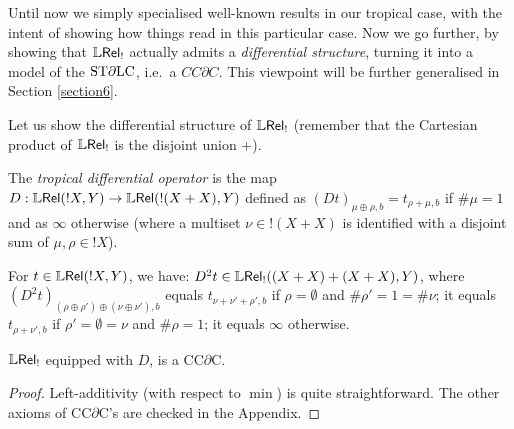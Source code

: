 Until now we simply specialised well-known results in our tropical case, with the intent of showing how things read in this particular case.
Now we go further, by showing that $\mathbb{L} \mathsf{Rel}_!$ actually admits a \emph{differential structure}, turning it into a model of the $\mathrm{ST}\partial\mathrm{LC}$, i.e.~a $CC\partial C$.
This viewpoint
will be further generalised in Section \ref{section6}.

%
%

Let us show the differential structure of $\mathbb{L} \mathsf{Rel}_!$ (remember that the Cartesian product of $\mathbb{L} \mathsf{Rel}_!$ is the disjoint union $+$).

\begin{definition}
 The \emph{tropical differential operator} is the map $D:{\mathbb{L} \mathsf{Rel}}(!X,Y)\to {\mathbb{L}\mathsf{Rel}}(!(X+X),Y)$ defined as $(Dt)_{\mu\oplus\rho,b}=t_{\rho+\mu,b}$ if $\#\mu=1$ and as $\infty$ otherwise (where a multiset $\nu \in !(X+X)$ is identified with a disjoint sum of $\mu,\rho\in !X$).
\end{definition}

\begin{remark}
For $t\in{\mathbb{L}\mathsf{Rel}}(!X,Y)$, we have:
 $D^2 t\in{\mathbb{L}\mathsf{Rel}_!}((X+X)+(X+X),Y)$, where $(D^2 t)_{(\rho\oplus\rho')\oplus(\nu\oplus\nu'),b}$ equals $t_{\nu+\nu'+\rho',b}$ if $\rho=\emptyset$ and $\#\rho'=1=\#\nu$; it equals $t_{\rho+\nu',b}$ if $\rho'=\emptyset=\nu$ and $\#\rho=1$; it equals $\infty$ otherwise.
\end{remark}

\begin{theorem}\label{thm:LREL!CCDC}
 $\mathbb{L} \mathsf{Rel}_!$ equipped with $D$, is a CC$\partial$C.
\end{theorem}
\begin{proof}
 Left-additivity (with respect to $\min$) is quite straightforward.
 The other axioms of CC$\partial$C's are checked in the Appendix.
\end{proof}

